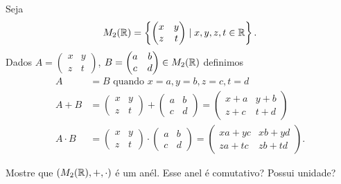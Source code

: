 \documentclass[12pt]{exam}
\begin{document}
\questao Seja
\[
    M_2(\mathbb{R}) = \left\{\begin{pmatrix}
        x & y\\z & t 
    \end{pmatrix} \mid x, y, z, t \in \mathbb{R} \right\}.
\]
Dados $A = \begin{pmatrix}
        x & y\\z & t 
    \end{pmatrix}$, $B = \begin{pmatrix}
        a & b\\c & d 
    \end{pmatrix} \in M_2(\mathbb{R})$ definimos
\begin{align*}
    A &= B \mbox{ quando } x = a, y = b, z = c, t = d\\
    A + B &= \begin{pmatrix}
        x & y\\z & t 
    \end{pmatrix} + \begin{pmatrix}
        a & b\\c & d 
    \end{pmatrix} = \begin{pmatrix}
        x + a & y + b\\z + c & t + d 
    \end{pmatrix}\\
    A \cdot B &= \begin{pmatrix}
        x & y\\z & t 
    \end{pmatrix} \cdot \begin{pmatrix}
        a & b\\c & d 
    \end{pmatrix} = \begin{pmatrix}
        xa + yc & xb + yd\\za + tc & zb + td 
    \end{pmatrix}.
\end{align*}

Mostre que $(M_2(\mathbb{R}), + , \cdot)$ \'e um an\'el. Esse anel \'e comutativo? Possui unidade?
\end{document}
